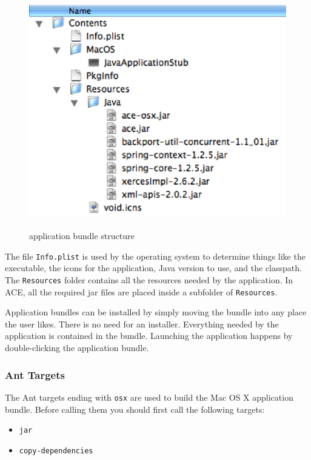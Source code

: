 \documentclass[11pt,a4paper]{article}
\begin{document}
\begin{figure}[H]
 \centering
 \includegraphics[width=12.3cm,height=10.2cm]{../images/developersguide/app-bundle.eps}
 \caption{application bundle structure}
\end{figure}

The file \texttt{Info.plist} is used by the operating system to determine
things like the executable, the icons for the application, Java version to
use, and the classpath. The \texttt{Resources} folder contains all the
resources needed by the application. In ACE, all the required jar files
are placed inside a subfolder of \texttt{Resources}.

Application bundles can be installed by simply moving the bundle into any
place the user likes. There is no need for an installer. Everything needed
by the application is contained in the bundle. Launching the application
happens by double-clicking the application bundle.

\subsubsection{Ant Targets}
The Ant targets ending with \texttt{osx} are used to build the Mac OS X
application bundle. Before calling them you should first call the following
targets:

\begin{itemize}
 \item \texttt{jar}
 \item \texttt{copy-dependencies}
\end{itemize}
\end{document}
